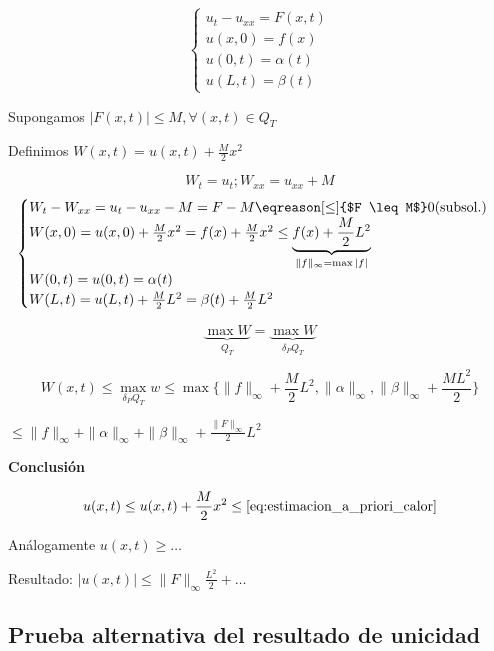 	 \begin{example}

	 	\[\begin{cases}
	 		u_{t} - u_{xx} = F(x,t) \\
			u(x,0) = f(x) \\
			u(0,t) = \alpha(t) \\
			u(L,t) = \beta(t)
	 	\end{cases}\]

	 	Supongamos $|F(x,t)| \leq M, \forall(x,t) \in Q_T$

	 	Definimos $W(x,t) = u(x,t) + \frac{M}{2} x^2$

	 	\[ W_t = u_t ; W_{xx} = u_{xx} + M\]
	 	\[\begin{cases}
	 		W_t - W_{xx} = u_t - u_{xx} - M = F-M \eqreason[\leq]{$F \leq M$} 0 (\text{subsol.})\\
	 		W(x,0) = u(x,0) + \frac{M}{2} x^2 = f(x) + \frac{M}{2} x^2 \leq \underbrace{f(x) + \frac{M}{2}L^2}_{\|f\|_\infty = \max |f|}\\
	 		W(0,t) = u(0,t) = \alpha(t) \\
	 		W(L,t) = u(L,t) + \frac{M}{2}L^2 = \beta(t) + \frac{M}{2} L^2
	 	\end{cases}\]

	 	\[ \underbrace{\max W}_{Q_T} = \underbrace{\max W}_{\delta_P Q_T} \]

	 	\[ W(x,t) \leq \max\limits_{\delta_P Q_T} w \leq \max \{ \|f\|_\infty + \frac{M}{2}L^2, \|\alpha\|_\infty, \|\beta\|_\infty + \frac{ML^2}{2}\} \]

	 	\(\leq \|f\|_\infty + \|\alpha\|_\infty + \|\beta\|_\infty + \frac{\|F\|_\infty}{2}L^2 \label{eq:estimacion_a_priori_calor}\)

	 	\textbf{Conclusión}

	 	\[ u(x,t) \leq u(x,t) + \frac{M}{2}x^2 \leq \eqref{eq:estimacion_a_priori_calor} \]

	 	Análogamente $u(x,t) \geq … $

	 	Resultado: $|u(x,t)| \leq \|F\|_\infty \frac{L^2}{2} + … $





	\end{example}



	\subsection{Prueba alternativa del resultado de unicidad}


